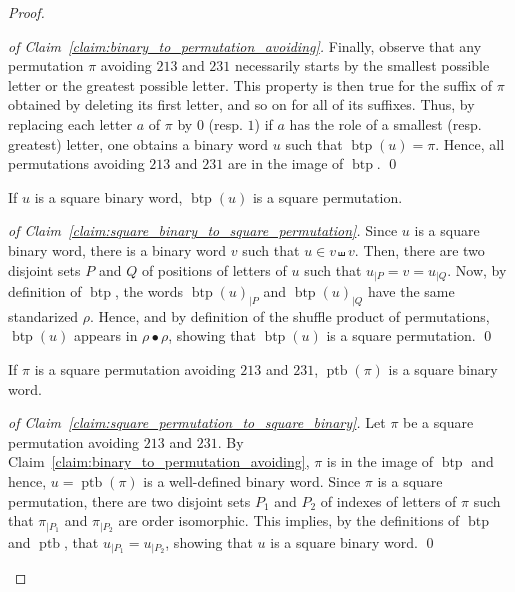 \documentclass[a4paper,10pt]{llncs}
\DeclareMathOperator{\SHUFFLE}{\bullet}
\DeclareMathOperator{\BINTOPERM}{\mathrm{btp}}
\DeclareMathOperator{\PERMTOBIN}{\mathrm{ptb}}
\begin{document}
\begin{proof}
\begin{proof}[of Claim~\ref{claim:binary_to_permutation_avoiding}]
        Finally, observe that any permutation $\pi$ avoiding $213$ and
        $231$ necessarily starts by the smallest possible letter or the
        greatest possible letter. This property is then true for the
        suffix of $\pi$ obtained by deleting its first letter,
        and so on for all of its suffixes. Thus, by
        replacing each letter $a$ of $\pi$ by $0$ (resp. $1$) if $a$ has the
        role of a smallest (resp. greatest) letter, one obtains a binary
        word $u$ such that $\BINTOPERM(u) = \pi$. Hence, all permutations
        avoiding $213$ and $231$ are in the image of $\BINTOPERM$.
        \qed
    \end{proof}
    \begin{claim} \label{claim:square_binary_to_square_permutation}
        If $u$ is a square binary word, $\BINTOPERM(u)$ is a square
        permutation.
    \end{claim}
    \begin{proof}[of Claim~\ref{claim:square_binary_to_square_permutation}]
        Since $u$ is a square binary word, there is a binary word $v$
        such that $u \in v \shuffle v$. Then, there are two disjoint
        sets $P$ and $Q$ of positions of letters of $u$ such that
        $u_{|P} = v = u_{|Q}$. Now, by definition of $\BINTOPERM$, the
        words $\BINTOPERM(u)_{|P}$ and $\BINTOPERM(u)_{|Q}$ have the
        same standarized $\rho$. Hence, and by definition of the shuffle
        product of permutations, $\BINTOPERM(u)$ appears in
        $\rho \SHUFFLE \rho$, showing that $\BINTOPERM(u)$ is a square
        permutation.
        \qed
    \end{proof}
    \begin{claim} \label{claim:square_permutation_to_square_binary}
        If $\pi$ is a square permutation avoiding $213$ and $231$,
        $\PERMTOBIN(\pi)$ is a square binary word.
    \end{claim}
    \begin{proof}[of Claim~\ref{claim:square_permutation_to_square_binary}]
        Let $\pi$ be a square permutation avoiding $213$ and $231$. By
        Claim~\ref{claim:binary_to_permutation_avoiding}, $\pi$ is in
        the image of $\BINTOPERM$ and hence, $u = \PERMTOBIN(\pi)$ is a
        well-defined binary word. Since $\pi$ is a square permutation,
        there are two disjoint sets $P_1$ and $P_2$ of indexes of letters
        of $\pi$ such that $\pi_{|P_1}$ and $\pi_{|P_2}$ are order
        isomorphic. This implies, by the definitions of $\BINTOPERM$ and
        $\PERMTOBIN$, that $u_{|P_1} = u_{|P_2}$, showing that $u$ is a
        square binary word.
        \qed
    \end{proof}
\end{proof}
\medskip
\end{document}
